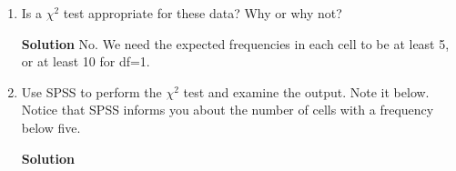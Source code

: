 \begin{enumerate}
\begin{enumerate}
\begin{framed}{\textbf{Solution}}
\begin{align}
            \implies \E\brac{M_H \cap C_H} &= 45 \times 2.47\% = \frac{50}{45} = 1.1\bar{1}.
            \intertext{The expected number of homo/bisexual children who also have a homosexual mother is less than the observed value of 2, and is 1.11. The other probabilities are calculated in the following way:}
            \pr{M_S \cap C_H} &= \pr{M_S} \times \pr{C_H} = \frac{20}{45} \times \frac{2+0}{45} = \frac{40}{45^2} \approx 1.98\%. \\
            \pr{M_H \cap C_S} &= \pr{M_H} \times \pr{C_S} = \frac{25}{45} \times \frac{23+20}{45} = \frac{1075}{45^2} \approx 53.09\%. \\
            \pr{M_S \cap C_S} &= \pr{M_S} \times \pr{C_S} = \frac{20}{45} \times \frac{23+20}{45} = \frac{860}{45^2} \approx 42.47\%.
            \intertext{Which gives us the following expected values:}
            \implies \E\brac{M_S \cap C_H} &= 45 \times 1.98\% = \frac{40}{45} = 0.8\bar{8}. \\
            \E\brac{M_H \cap C_S} &= 45 \times 53.09\% = \frac{1075}{45} = 23.8\bar{8}. \\
            \E\brac{M_S \cap C_S} &= 45 \times 42.47\% = \frac{860}{45} = 19.1\bar{1}. 
        \end{align}
        \end{framed}
        
        \item Is a $\chi^2$ test appropriate for these data? Why or why not?
        \begin{framed}{\textbf{Solution}}
        No. We need the expected frequencies in each cell to be at least 5, or at least 10 for df=1.
        \end{framed}
        
        \item Use SPSS to perform the $\chi^2$ test and examine the output. Note it below. Notice that SPSS informs you about the number of cells with a frequency below five.
        \begin{framed}{\textbf{Solution}}
        

\end{framed}
\end{enumerate}
\end{enumerate}
